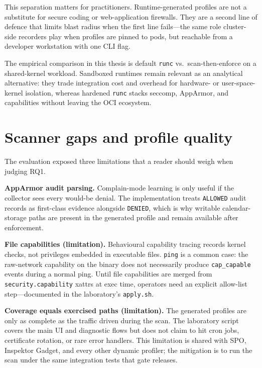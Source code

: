 This separation matters for practitioners. Runtime-generated profiles are not a substitute for secure coding or web-application firewalls. They are a second line of defence that limits blast radius when the first line fails---the same role cluster-side recorders play when profiles are pinned to pods, but reachable from a developer workstation with one CLI flag.

The empirical comparison in this thesis is default \texttt{runc} vs.\ scan-then-enforce on a shared-kernel workload. Sandboxed runtimes remain relevant as an analytical alternative: they trade integration cost and overhead for hardware- or user-space-kernel isolation, whereas hardened \texttt{runc} stacks seccomp, AppArmor, and capabilities without leaving the OCI ecosystem.

\section{Scanner gaps and profile quality}\label{sec:disc-scanner}

The evaluation exposed three limitations that a reader should weigh when judging RQ1.

\textbf{AppArmor audit parsing.} Complain-mode learning is only useful if the collector sees every would-be denial. The implementation treats \texttt{ALLOWED} audit records as first-class evidence alongside \texttt{DENIED}, which is why writable calendar-storage paths are present in the generated profile and remain available after enforcement.

\textbf{File capabilities (limitation).} Behavioural capability tracing records kernel checks, not privileges embedded in executable files. \texttt{ping} is a common case: the raw-network capability on the binary does not necessarily produce \texttt{cap\_capable} events during a normal ping. Until file capabilities are merged from \texttt{security.capability} xattrs at exec time, operators need an explicit allow-list step---documented in the laboratory's \texttt{apply.sh}.

\textbf{Coverage equals exercised paths (limitation).} The generated profiles are only as complete as the traffic driven during the scan. The laboratory script covers the main UI and diagnostic flows but does not claim to hit cron jobs, certificate rotation, or rare error handlers. This limitation is shared with SPO, Inspektor Gadget, and every other dynamic profiler; the mitigation is to run the scan under the same integration tests that gate releases.

